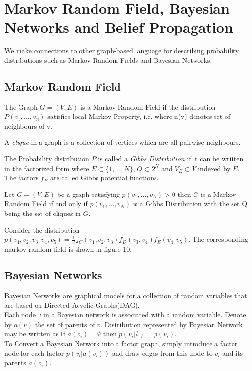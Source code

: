 \documentclass[letterpaper,english,10pt]{article}
\begin{document}
\section{Markov Random Field, Bayesian Networks and Belief Propagation}
We make connections to other graph-based language for describing probability distributions such as Markov Random Fields and Bayesian Networks.
\subsection{Markov Random Field}
\begin{defn} The Graph $G = (V,E)$ is a Markov Random Field if the distribution $P(v_1,\dots,v_n)$ satisfies local Markov Property, i.e.
 where n(v) denotes set of neighbours of v.
\end{defn}
A \textit{clique} in a graph is a collection of vertices which are all pairwise neighbours.
\begin{defn}
The Probability distribution $P$ is called a \textit{Gibbs Distribution} if it can be written in the factorized form
where $E \subset \{1,\dots,N\}$, $Q \subset 2^N$ and $V_E \subset V$ indexed by $E$. The factors $f_E$ are called Gibbs potential functions.
\end{defn}
\begin{thm}
Let $G = (V,E)$ be a graph satisfying $p(v_1,\dots,v_N) > 0$ then $G$ is a Markov Random Field if and only if $p(v_1,\dots,v_N)$ is a Gibbs
Distribution with the set Q being the set of cliques in $G$.
\end{thm}
\begin{exmp}
Consider the distribution $p(v_1,v_2,v_3,v_4,v_5) = \frac{1}{Z}f_C(v_1,v_2,v_3)f_D(v_3,v_4)f_E(v_4,v_5)$. The corresponding markov random field
is shown in figure 10. 
\end{exmp}
\subsection{Bayesian Networks}
Bayesian Networks are graphical models for a collection of random variables that are based on Directed Acyclic Graphs(DAG).\\
Each  node $v$ in a Bayesian network is associated with a random variable. Denote by $a(v)$ the set of parents of $v$. Distribution represented
by Bayesian Network may be written as
 If $a(v_i) =\emptyset$ then $p(v_i|\emptyset) = p(v_i)$.\\
To Convert a Bayesian Network into a factor graph, simply introduce a factor node for each factor $p(v_i|a(v_i))$ and draw edges from this
node to $v_i$ and its parents $a(v_i)$.
\end{document}
